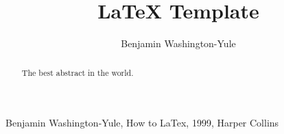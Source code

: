 \documentclass[a4paper, 12pt]{article}
\begin{document}
\title{LaTeX Template}
\author{Benjamin Washington-Yule}

\maketitle
% 

\begin{abstract}
The best abstract in the world.
\end{abstract}






\begin{thebibliography}{99}
 Benjamin Washington-Yule, How to LaTex, 1999, Harper Collins
\end{thebibliography}
\end{document}
